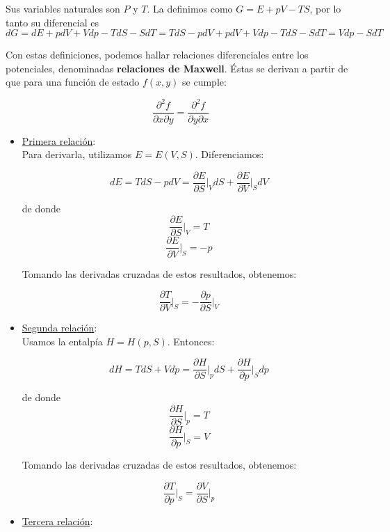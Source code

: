 \documentclass[a4paper]{article}
\begin{document}
Sus variables naturales son $P$ y $T$. La definimos como $G = E + pV - TS$, por lo tanto su diferencial es $$dG = dE + pdV + Vdp - TdS - SdT = TdS - pdV + pdV + Vdp - TdS - SdT = Vdp - SdT$$

Con estas definiciones, podemos hallar relaciones diferenciales entre los potenciales, denominadas \textbf{relaciones de Maxwell}. \'Estas se derivan a partir de que para una funci\'on de estado $f(x,y)$ se cumple:

$$ \frac{\partial^{2} f}{\partial x \partial y} =  \frac{\partial^{2} f}{\partial y \partial x}$$

\begin{itemize}
\item \underline{Primera relaci\'on}:\\

Para derivarla, utilizamos $E = E(V, S)$. Diferenciamos:

$$dE = TdS - pdV = \frac{\partial E}{\partial S}\bigg|_{V}dS + \frac{\partial E}{\partial V}\bigg|_{S}dV$$

de donde $$\frac{\partial E}{\partial S}\bigg|_{V} = T$$ $$\frac{\partial E}{\partial V}\bigg|_{S} = -p$$

Tomando las derivadas cruzadas de estos resultados, obtenemos:

\begin{equation}
\label{maxwell1}
\frac{\partial T}{\partial V}\bigg|_{S} = -\frac{\partial p}{\partial S}\bigg|_{V}
\end{equation}

\item \underline{Segunda relaci\'on}:\\

Usamos la entalp\'ia $H = H(p, S)$. Entonces:

$$dH = TdS + Vdp = \frac{\partial H}{\partial S}\bigg|_{p}dS + \frac{\partial H}{\partial p}\bigg|_{S}dp$$

de donde $$\frac{\partial H}{\partial S}\bigg|_{p} = T$$ $$\frac{\partial H}{\partial p}\bigg|_{S} = V$$

Tomando las derivadas cruzadas de estos resultados, obtenemos:

\begin{equation}
\label{maxwell2}
\frac{\partial T}{\partial p}\bigg|_{S} = \frac{\partial V}{\partial S}\bigg|_{p}
\end{equation}

\item \underline{Tercera relaci\'on}:\\


\end{itemize}
\end{document}

